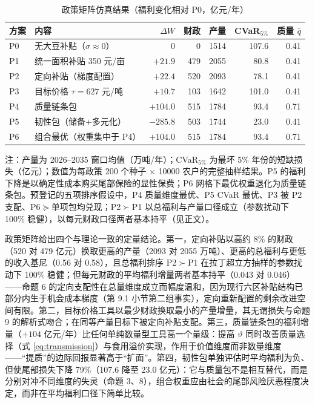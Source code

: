 \documentclass[UTF8,zihao=-4,fontset=fandol]{ctexart}
\numberwithin{equation}{section}
\theoremstyle{definition}
\theoremstyle{remark}
\begin{document}
\begin{table}[H]
\centering
\caption{政策矩阵仿真结果（福利变化相对 P0，亿元/年）}
\label{tab:polmatrix}
\begin{threeparttable}
\footnotesize
\begin{tabularx}{\textwidth}{lXrrrrr}
\toprule
方案 & 内容 & $\Delta W$ & 财政 & 产量 & CVaR$_{5\%}$ & 质量 $\bar q$\\
\midrule
P0 & 无大豆补贴（$\sigma\approx0$） & 0 & 0 & 1514 & 107.6 & 0.41\\
P1 & 统一面积补贴 350 元/亩 & $+21.9$ & 479 & 2055 & 80.8 & 0.41\\
P2 & 定向补贴（梯度配置） & $+22.4$ & 520 & 2093 & 78.1 & 0.41\\
P3 & 目标价格 $\tau=627$ 元/吨 & $+10.7$ & 103 & 1642 & 101.0 & 0.41\\
P4 & 质量链条包 & $+104.0$ & 515 & 1784 & 93.4 & 0.71\\
P5 & 韧性包（储备$+$多元化） & $-285.8$ & 503 & 1744 & 23.0 & 0.41\\
P6 & 组合最优（权重集中于 P4） & $+104.0$ & 515 & 1784 & 93.4 & 0.71\\
\bottomrule
\end{tabularx}
\begin{tablenotes}[flushleft]
\footnotesize
\item 注：产量为 2026--2035 窗口均值（万吨/年）；CVaR$_{5\%}$ 为最坏 5\% 年份的短缺损失（亿元）；数值为每政策 200 个种子 $\times$ 10000 农户的完整抽样结果。P5 的福利下降是以确定性成本购买尾部保险的显性保费；P6 网格下最优权重退化为质量链条包。预登记的五项排序假设中，P4 质量维度最优、P5 CVaR 最优、P3 被 P2 支配、P6$\succeq$单项包均兑现；P2$\succ$P1 以总福利与产量口径成立（参数扰动下 100\% 稳健），以每元财政口径两者基本持平（见正文）。
\end{tablenotes}
\end{threeparttable}
\end{table}

政策矩阵给出四个与理论一致的定量结论。第一，定向补贴以高约 8\% 的财政（520 对 479 亿元）换取更高的产量（2093 对 2055 万吨）、更高的总福利与更低的收入基尼（0.56 对 0.58），且总福利排序 P2$\succ$P1 在拉丁超立方抽样的参数扰动下 100\% 稳健；但每元财政的平均福利增量两者基本持平（0.043 对 0.046）——命题 6 的定向支配性在总量维度成立而幅度温和，因为现行六区补贴结构已部分内生于机会成本梯度（第 9.1 小节第二组事实），定向重新配置的剩余改进空间有限。第二，目标价格工具以最少财政换取最小的产量增量，其无谓损失与命题 9 的解析式吻合；在同等产量目标下被定向补贴支配。第三，质量链条包的福利增量（$+104$ 亿元/年）比任何单纯数量型工具高一个量级：提高 $\vartheta$ 同时改善质量选择（式 \eqref{eq:transmission}）与食用溢价实现，作用于价值维度而非数量维度——“提质”的边际回报显著高于“扩面”。第四，韧性包单独评估时平均福利为负、但使尾部损失下降 79\%（107.6 降至 23.0 亿元）：它与质量包不是相互替代，而是分别对冲不同维度的失灵（命题 3、8），组合权重应由社会的尾部风险厌恶程度决定，而非在平均福利口径下简单比较。
\end{document}
